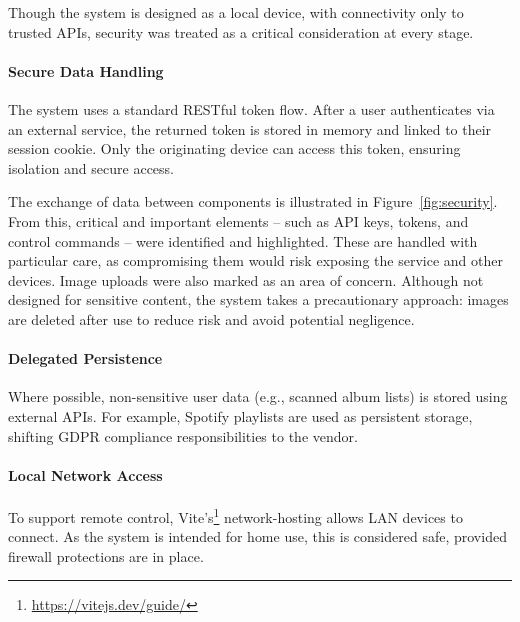             Though the system is designed as a local device, with connectivity only to trusted APIs, security was treated as a critical consideration at every stage.
    
            \paragraph{Secure Data Handling} The system uses a standard RESTful token flow. After a user authenticates via an external service, the returned token is stored in memory and linked to their session cookie. Only the originating device can access this token, ensuring isolation and secure access.
    
            The exchange of data between components is illustrated in Figure~\ref{fig:security}. From this, critical and important elements -- such as API keys, tokens, and control commands -- were identified and highlighted. These are handled with particular care, as compromising them would risk exposing the service and other devices. Image uploads were also marked as an area of concern. Although not designed for sensitive content, the system takes a precautionary approach: images are deleted after use to reduce risk and avoid potential negligence.
    
            \paragraph{Delegated Persistence} Where possible, non-sensitive user data (e.g., scanned album lists) is stored using external APIs. For example, Spotify playlists are used as persistent storage, shifting GDPR compliance responsibilities to the vendor.
    
            \paragraph{Local Network Access} To support remote control, Vite's\footnote{\url{https://vitejs.dev/guide/}} network-hosting allows LAN devices to connect. As the system is intended for home use, this is considered safe, provided firewall protections are in place.
    

